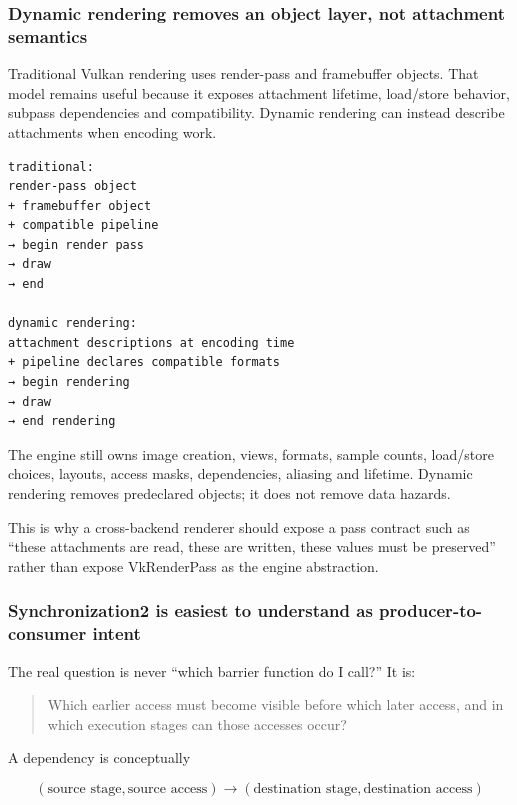 \subsubsection{Dynamic rendering removes an object layer, not attachment semantics}\label{05-engine-i-ch023-dynamic-rendering-removes-an-object-layer-not-attachment-semantics}

Traditional Vulkan rendering uses render-pass and framebuffer objects. That model remains useful because it exposes attachment lifetime, load/store behavior, subpass dependencies and compatibility. Dynamic rendering can instead describe attachments when encoding work.

\begin{verbatim}
traditional:
render-pass object
+ framebuffer object
+ compatible pipeline
→ begin render pass
→ draw
→ end

dynamic rendering:
attachment descriptions at encoding time
+ pipeline declares compatible formats
→ begin rendering
→ draw
→ end rendering
\end{verbatim}

The engine still owns image creation, views, formats, sample counts, load/store choices, layouts, access masks, dependencies, aliasing and lifetime. Dynamic rendering removes predeclared objects; it does not remove data hazards.

This is why a cross-backend renderer should expose a pass contract such as ``these attachments are read, these are written, these values must be preserved'' rather than expose VkRenderPass as the engine abstraction.

\subsubsection{Synchronization2 is easiest to understand as producer-to-consumer intent}\label{05-engine-i-ch023-synchronization2-is-easiest-to-understand-as-producer-to-consumer-intent}

The real question is never ``which barrier function do I call?'' It is:

\begin{quote}
Which earlier access must become visible before which later access, and in which execution stages can those accesses occur?
\end{quote}

A dependency is conceptually

\[
\boxed{
(\text{source stage},\text{source access})
\rightarrow
(\text{destination stage},\text{destination access})
}
\]

